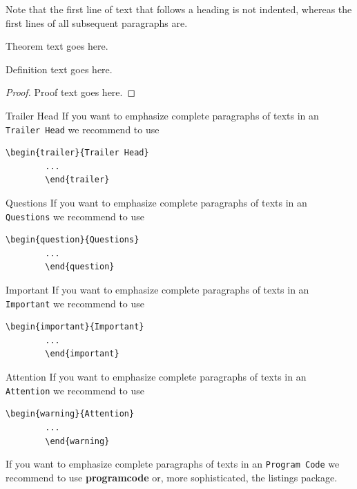 \begin{bibunit}
	Note that the first line of text that follows a heading is not indented, whereas the first lines of all subsequent paragraphs are.
	\begin{theorem}
		Theorem text goes here.
	\end{theorem}
	\begin{definition}
		Definition text goes here.
	\end{definition}
	\begin{proof}
		Proof text goes here.
	\end{proof}
	\begin{trailer}{Trailer Head}
		If you want to emphasize complete paragraphs of texts in an \verb|Trailer Head| we recommend to
		use  \begin{verbatim}\begin{trailer}{Trailer Head}
		...
		\end{trailer}\end{verbatim}
	\end{trailer}
	\begin{question}{Questions}
		If you want to emphasize complete paragraphs of texts in an \verb|Questions| we recommend to
		use  \begin{verbatim}\begin{question}{Questions}
		...
		\end{question}\end{verbatim}
	\end{question}
	\eject%
	\begin{important}{Important}
		If you want to emphasize complete paragraphs of texts in an \verb|Important| we recommend to
		use  \begin{verbatim}\begin{important}{Important}
		...
		\end{important}\end{verbatim}
	\end{important}
	\begin{warning}{Attention}
		If you want to emphasize complete paragraphs of texts in an \verb|Attention| we recommend to
		use  \begin{verbatim}\begin{warning}{Attention}
		...
		\end{warning}\end{verbatim}
	\end{warning}
	
	If you want to emphasize complete paragraphs of texts in an \verb|Program Code| we recommend to
	use \textbf{programcode} or, more sophisticated, the listings package.
	

\end{bibunit}
